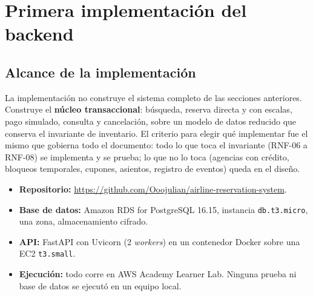 \section{Primera implementación del backend}
\label{sec:impl}

\subsection{Alcance de la implementación}
La implementación no construye el sistema completo de las secciones anteriores. Construye el \textbf{núcleo transaccional}: búsqueda, reserva directa y con escalas, pago simulado, consulta y cancelación, sobre un modelo de datos reducido que conserva el invariante de inventario. El criterio para elegir qué implementar fue el mismo que gobierna todo el documento: todo lo que toca el invariante (RNF-06 a RNF-08) se implementa y se prueba; lo que no lo toca (agencias con crédito, bloqueos temporales, cupones, asientos, registro de eventos) queda en el diseño.

\begin{itemize}
  \item \textbf{Repositorio:} \url{https://github.com/Ooojulian/airline-reservation-system}.
  \item \textbf{Base de datos:} Amazon RDS for PostgreSQL 16.15, instancia \texttt{db.t3.micro}, una zona, almacenamiento cifrado.
  \item \textbf{API:} FastAPI con Uvicorn (2 \emph{workers}) en un contenedor Docker sobre una EC2 \texttt{t3.small}.
  \item \textbf{Ejecución:} todo corre en AWS Academy Learner Lab. Ninguna prueba ni base de datos se ejecutó en un equipo local.
\end{itemize}

